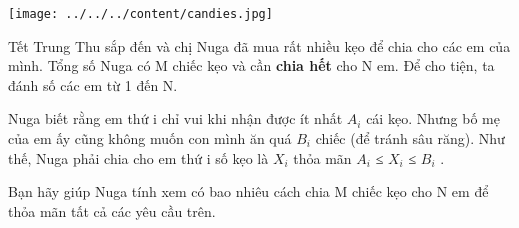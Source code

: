 \texttt{[image: ../../../content/candies.jpg]}

   Tết Trung Thu sắp đến và chị Nuga đã mua rất nhiều kẹo để chia cho các em của mình. Tổng số Nuga có M chiếc kẹo và cần   \textbf{    chia hết   }   cho N em. Để cho tiện, ta đánh số các em từ 1 đến N.  

   Nuga biết rằng em thứ i chỉ vui khi nhận được ít nhất $A_{i}$   cái kẹo. Nhưng bố mẹ của em ấy cũng không muốn con mình ăn quá $B_{i}$   chiếc (để tránh sâu răng). Như thế, Nuga phải chia cho em thứ i số kẹo là $X_{i}$   thỏa mãn $A_{i}$   ≤ $X_{i}$   ≤ $B_{­i}$   .  

   Bạn hãy giúp Nuga tính xem có bao nhiêu cách chia M chiếc kẹo cho N em để thỏa mãn tất cả các yêu cầu trên.